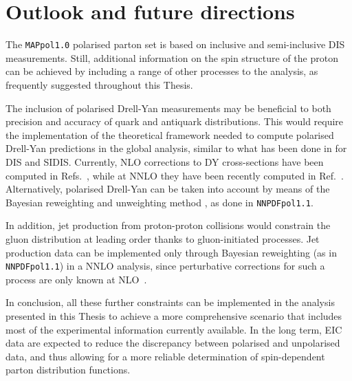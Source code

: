 \section{Outlook and future directions}
%
The \texttt{MAPpol1.0} polarised parton set is based on inclusive and semi-inclusive DIS measurements. Still, additional information on the spin structure of the proton can be achieved by including a range of other processes to the analysis, as frequently suggested throughout this Thesis.%

The inclusion of polarised Drell-Yan measurements may be beneficial to both precision and accuracy of quark and antiquark distributions. This would require the implementation of the theoretical framework needed to compute polarised Drell-Yan predictions in the global analysis, similar to what has been done in  for DIS and SIDIS. Currently, NLO corrections to DY cross-sections have been computed in Refs.~\cite{Gehrmann:1997ez,Bonvini:2010tp}, while at NNLO they have been recently computed in Ref.~\cite{Boughezal:2021wjw}. Alternatively, polarised Drell-Yan can be taken into account by means of the Bayesian reweighting and unweighting method \cite{Ball:2010gb, Ball:2011gg}, as done in \texttt{NNPDFpol1.1}.%

In addition, jet production from proton-proton collisions would constrain the gluon distribution at leading order thanks to gluon-initiated processes. Jet production data can be implemented only through Bayesian reweighting (as in \texttt{NNPDFpol1.1}) in a NNLO analysis, since perturbative corrections for such a process are only known at NLO~\cite{deFlorian:1998qp}.%

In conclusion, all these further constraints can be implemented in the analysis presented in this Thesis to achieve a more comprehensive scenario that includes most of the experimental information currently available. In the long term, EIC data are expected to reduce the discrepancy between polarised and unpolarised data, and thus allowing for a more reliable determination of spin-dependent parton distribution functions.